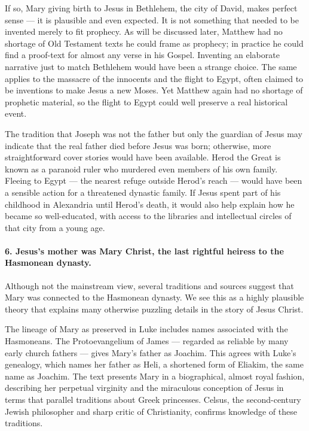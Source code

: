 If so, Mary giving birth to Jesus in Bethlehem, the city of David, makes perfect sense — it is plausible and even expected.
It is not something that needed to be invented merely to fit prophecy.
As will be discussed later, Matthew had no shortage of Old Testament texts he could frame as prophecy; in practice he could find a proof-text for almost any verse in his Gospel.
Inventing an elaborate narrative just to match Bethlehem would have been a strange choice.
The same applies to the massacre of the innocents and the flight to Egypt, often claimed to be inventions to make Jesus a new Moses.
Yet Matthew again had no shortage of prophetic material, so the flight to Egypt could well preserve a real historical event.

The tradition that Joseph was not the father but only the guardian of Jesus may indicate that the real father died before Jesus was born; otherwise, more straightforward cover stories would have been available.
Herod the Great is known as a paranoid ruler who murdered even members of his own family.
Fleeing to Egypt — the nearest refuge outside Herod’s reach — would have been a sensible action for a threatened dynastic family.
If Jesus spent part of his childhood in Alexandria until Herod’s death, it would also help explain how he became so well-educated, with access to the libraries and intellectual circles of that city from a young age.

\paragraph{6.
Jesus's mother was Mary Christ, the last rightful heiress to the Hasmonean dynasty.}\label{par:jesuss-mother-was-mary-christ-the-last-rightful-heiress-to-the-hasmonean-dynasty.}

Although not the mainstream view, several traditions and sources suggest that Mary was connected to the Hasmonean dynasty.
We see this as a highly plausible theory that explains many otherwise puzzling details in the story of Jesus Christ.

The lineage of Mary as preserved in Luke includes names associated with the Hasmoneans.
The Protoevangelium of James — regarded as reliable by many early church fathers — gives Mary’s father as Joachim.
This agrees with Luke’s genealogy, which names her father as Heli, a shortened form of Eliakim, the same name as Joachim.
The text presents Mary in a biographical, almost royal fashion, describing her perpetual virginity and the miraculous conception of Jesus in terms that parallel traditions about Greek princesses.
Celsus, the second-century Jewish philosopher and sharp critic of Christianity, confirms knowledge of these traditions.

